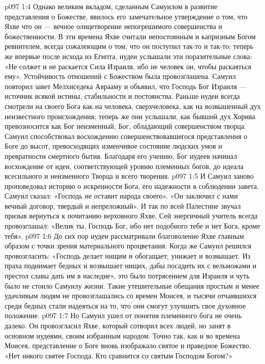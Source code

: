 \vs p097 1:4 Однако великим вкладом, сделанным Самуилом в развитие представления о Божестве, явилось его замечательное утверждение о том, что Яхве  что он --- вечное олицетворение непогрешимого совершенства и божественности. В эти времена Яхве считали непостоянным и капризным Богом ревнителем, всегда сожалеющим о том, что он поступил так\hyp{}то и так\hyp{}то; теперь же впервые после исхода из Египта, иудеи услышали эти поразительные слова: «Не солжет и не раскается Сила Израиля, ибо не человек он, чтобы раскаяться ему». Устойчивость отношений с Божеством была провозглашена. Самуил повторил завет Мелхиседека Аврааму и объявил, что Господь Бог Израиля --- источник всякой истины, стабильности и постоянства. Раньше иудеи всегда смотрели на своего Бога как на человека, сверхчеловека, как на возвышенный дух неизвестного происхождения; теперь же они услышали, как бывший дух Хорива превозносится как Бог неизменный, Бог, обладающий совершенством творца. Самуил способствовал восхождению совершенствовавшегося представления о Боге до высот, превосходящих изменчивое состояние людских умов и превратности смертного бытия. Благодаря его учению, Бог иудеев начинал восхождение от идеи, соответствующей уровню племенных богов, до идеала всесильного и неизменного Творца и  всего творения.
\vs p097 1:5 И Самуил заново проповедовал историю о искренности Бога, его надежности в соблюдении завета. Самуил сказал: «Господь не оставит народа своего». «Он заключил с нами вечный договор, твердый и непреложный». И так по всей Палестине звучал призыв вернуться к почитанию верховного Яхве. Сей энергичный учитель всегда провозглашал: «Велик ты, Господь Бог, ибо нет подобного тебе и нет Бога, кроме тебя».
\vs p097 1:6 \pc До сих пор иудеи рассматривали благоволение Яхве главным образом с точки зрения материального процветания. Когда же Самуил решился провозгласить: «Господь делает нищим и обогащает; унижает и возвышает. Из праха поднимает бедных и возвышает нищих, дабы посадить их с вельможами и престол славы дать им в наследие», это было потрясением для Израиля и чуть было не стоило Самуилу жизни. Такие утешительные обещания простым и менее удачливым людям не провозглашались со времен Моисея, и тысячи отчаявшихся среди бедных стали надеяться на то, что они смогут улучшить свое духовное положение.
\vs p097 1:7 Но Самуил ушел от понятия племенного бога не очень далеко. Он провозгласил Яхве, который сотворил всех людей, но занят в основном иудеями, своим избранным народом. Точно так, как и во времена Моисея, представление о Боге вновь изображало святое и праведное Божество. «Нет никого святее Господа. Кто сравнится со святым Господом Богом?»
